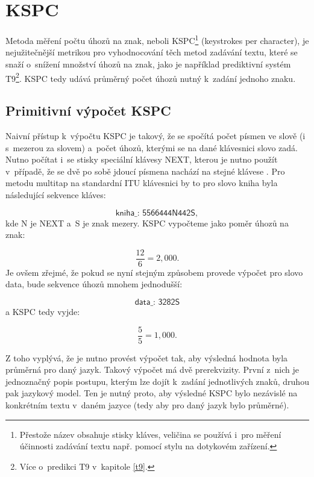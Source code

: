 \documentclass[a4paper,11pt,openany]{book} %
\newcommand\exmp{\textsf}
\begin{document}
\section{KSPC}

Metoda měření počtu úhozů na znak, neboli KSPC\footnote{Přestože název obsahuje stisky kláves, veličina se používá i~pro měření účinnosti zadávání textu např. pomocí stylu na dotykovém zařízení.} (keystrokes per character), je nejužitečnější metrikou pro vyhodnocování těch metod zadávání textu, které se snaží o~snížení množství úhozů na znak, jako  je například prediktivní systém T9\footnote{Více o~predikci T9 v~kapitole \ref{t9}.}. KSPC tedy udává průměrný počet úhozů nutný k~zadání jednoho znaku.

\subsection{Primitivní výpočet KSPC}

Naivní přístup k~výpočtu KSPC je takový, že se spočítá počet písmen ve slově (i s~mezerou za slovem) a~počet úhozů, kterými se na dané klávesnici slovo zadá. Nutno počítat i~se stisky speciální klávesy \exmp{NEXT}, kterou je nutno použít v~případě, že se dvě po sobě jdoucí písmena nachází na stejné klávese \parencite[10]{silfverberg2000predicting}. %
Pro metodu multitap na standardní ITU klávesnici by to pro slovo \exmp{kniha} byla následující sekvence kláves:

\[
	\exmp{kniha\_: 5566444N442S},
\]
kde \exmp{N} je \exmp{NEXT} a~\exmp{S} je znak mezery. KSPC vypočteme jako poměr úhozů na znak:

\[
	\frac{12}{6} = 2,000.
\]
Je ovšem zřejmé, že pokud se nyní stejným způsobem provede výpočet pro slovo \exmp{data}, bude sekvence úhozů mnohem jednodušší:

\[
	\exmp{data\_: 3282S}
\]
a KSPC tedy vyjde:

\[
	\frac{5}{5} = 1,000.
\]

Z toho vyplývá, že je nutno provést výpočet tak, aby výsledná hodnota byla průměrná pro daný jazyk. Takový výpočet má dvě prerekvizity. První z~nich je jednoznačný popis postupu, kterým lze dojít k~zadání jednotlivých znaků, druhou pak jazykový model. Ten je nutný proto, aby výsledné KSPC bylo nezávislé na konkrétním textu v~daném jazyce (tedy aby pro daný jazyk bylo průměrné). \parencite[196]{mackenzie2002kspc}
\end{document}
